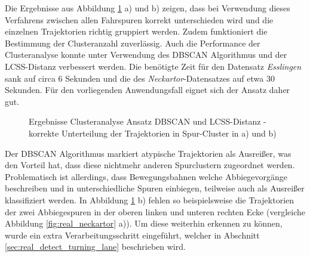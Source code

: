 Die Ergebnisse aus Abbildung \ref{fig:real_results_dbscan_lcss} a) und b) zeigen, dass bei Verwendung
dieses Verfahrens zwischen allen Fahrspuren korrekt unterschieden wird und die einzelnen Trajektorien
richtig gruppiert werden. Zudem funktioniert die Bestimmung der Clusteranzahl zuverlässig.
Auch die Performance der Clusteranalyse konnte unter Verwendung des DBSCAN Algorithmus und der LCSS-Distanz
verbessert werden. Die benötigte Zeit für den Datensatz \textit{Esslingen} sank auf circa 6 Sekunden und die des
\textit{Neckartor}-Datensatzes auf etwa 30 Sekunden. Für den vorliegenden Anwendungsfall eignet sich der Ansatz daher
gut.

\begin{figure}[H]
    \centering
    \qquad \qquad
    \caption[Ergebnisse Clusteranalyse Ansatz DBSCAN und LCSS-Distanz]
            {Ergebnisse Clusteranalyse Ansatz DBSCAN und LCSS-Distanz - korrekte Unterteilung der Trajektorien in Spur-Cluster in a) und b)}
    \label{fig:real_results_dbscan_lcss}
\end{figure}

Der DBSCAN Algorithmus markiert atypische Trajektorien als Ausreißer, was den Vorteil hat, dass
diese nichtmehr anderen Spurclustern zugeordnet werden. Problematisch ist allerdings, dass Bewegungsbahnen
welche Abbiegevorgänge beschreiben und in unterschiedliche Spuren einbiegen, teilweise auch als Ausreißer
klassifiziert werden. In Abbildung \ref{fig:real_results_dbscan_lcss} b) fehlen so beispielsweise die Trajektorien
der zwei Abbiegespuren in der oberen linken und unteren rechten Ecke (vergleiche Abbildung \ref{fig:real_neckartor} a)).
Um diese weiterhin erkennen zu können, wurde ein extra Verarbeitungsschritt eingeführt, welcher in Abschnitt
\ref{sec:real_detect_turning_lane} beschrieben wird.

